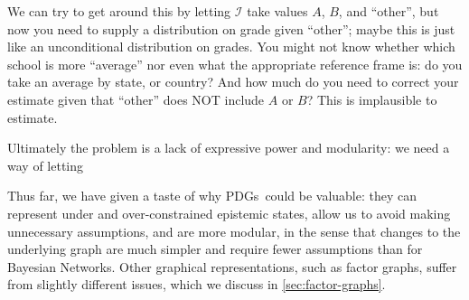 \documentclass{article}
\newcommand{\MN}{PDG}
\newcommand{\MNs}{\MN s}
\begin{document}
\begin{example}
		We can try to get around this by letting $\mathcal  I$ take values $A$, $B$, and ``other'', but now you need to supply a distribution on grade given ``other''; maybe this is just like an unconditional distribution on grades. You might not know whether which school is more ``average'' nor even what the appropriate reference frame is: do you take an average by state, or country? And how much do you need to correct your estimate given that ``other'' does NOT include $A$ or $B$? This is implausible to estimate. 		
	
	
		
		
		Ultimately the problem is a lack of expressive power and modularity: we need a way of letting 
		

		
		
		
		

	\end{example}

	Thus far, we have given a taste of why \MNs\ could be valuable: they can represent under and over-constrained epistemic states, allow us to avoid making unnecessary assumptions, and are more modular, in the sense that changes to the underlying graph are much simpler and require fewer assumptions than for Bayesian Networks.	
	Other graphical representations, such as factor graphs, suffer from slightly different issues, which we discuss in \cref{sec:factor-graphs}. 
		

\end{document}
